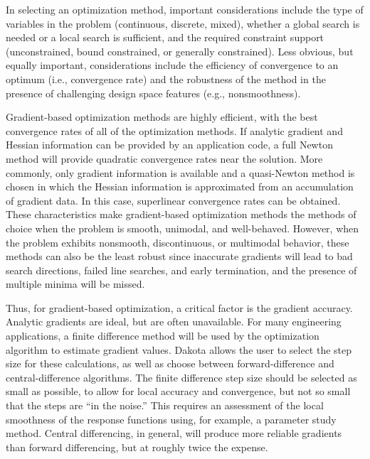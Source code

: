 In selecting an optimization method, important considerations include
the type of variables in the problem (continuous, discrete, mixed),
whether a global search is needed or a local search is sufficient, and
the required constraint support (unconstrained, bound constrained,
or generally constrained). Less obvious, but equally important,
considerations include the efficiency of convergence to an optimum
(i.e., convergence rate) and the robustness of the method in the
presence of challenging design space features (e.g., nonsmoothness).

Gradient-based optimization methods are highly efficient, with the
best convergence rates of all of the optimization methods. If analytic
gradient and Hessian information can be provided by an application
code, a full Newton method will provide quadratic convergence rates
near the solution. More commonly, only gradient information is
available and a quasi-Newton method is chosen in which the Hessian
information is approximated from an accumulation of gradient data. In
this case, superlinear convergence rates can be obtained. These
characteristics make gradient-based optimization methods the methods
of choice when the problem is smooth, unimodal, and
well-behaved. However, when the problem exhibits nonsmooth,
discontinuous, or multimodal behavior, these methods can also be the
least robust since inaccurate gradients will lead to bad search
directions, failed line searches, and early termination, and the
presence of multiple minima will be missed.

Thus, for gradient-based optimization, a critical factor is the
gradient accuracy. Analytic gradients are ideal, but are often
unavailable. For many engineering applications, a finite difference
method will be used by the optimization algorithm to estimate gradient
values. Dakota allows the user to select the step size for these
calculations, as well as choose between forward-difference and
central-difference algorithms. The finite difference step size should
be selected as small as possible, to allow for local accuracy and
convergence, but not so small that the steps are ``in the noise.'' 
This requires an assessment of the local smoothness of the response
functions using, for example, a parameter study method.  Central
differencing, in general, will produce more reliable gradients than
forward differencing, but at roughly twice the expense.

